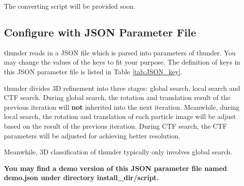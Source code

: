 \documentclass{article}
\begin{document}
            The converting script will be provided soon.
    
        \subsection{Configure with JSON Parameter File}\label{sec:JSON}
        
            \textsf{thunder} reads in a JSON file which is parsed into parameters of \textsf{thunder}. You may change the values of the keys to fit your purpose. The definition of keys in this JSON parameter file is listed in Table \ref{tab:JSON_key}.
            
            \textsf{thunder} divides 3D refinement into three stages: global search, local search and CTF search. During global search, the rotation and translation result of the previous iteration will \textbf{not} inherited into the next iteration. Meanwhile, during local search, the rotation and translation of each particle image will be adjust based on the result of the previous iteration. During CTF search, the CTF parameters will be adjusted for achieving better resolution.
            
            Meanwhile, 3D classification of \textsf{thunder} typically only involves global search.
                        
            \textbf{You may find a demo version of this JSON parameter file named \textsf{demo.json} under directory \textsf{install\_dir/script}.}
             
\end{document}
